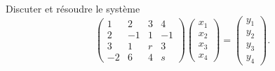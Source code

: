 

\begin{exercice}\label{exoINGE1121La0009}

	Discuter et résoudre le système
	\begin{equation}
		\begin{pmatrix}
			 1	&	2	&	3	&	4	\\
			 2	&	-1	&	1	&	-1	\\
			 3	&	1	&	r	&	3	\\ 
			 -2	&	6	&	4	&	s	 
		\end{pmatrix}
		\begin{pmatrix}
			x_1	\\ 
			x_2	\\ 
			x_3	\\ 
			x_4	
		\end{pmatrix}=
		\begin{pmatrix}
			y_1	\\ 
			y_2	\\ 
			y_3	\\ 
			y_4	
		\end{pmatrix}.
	\end{equation}
	

\end{exercice}
